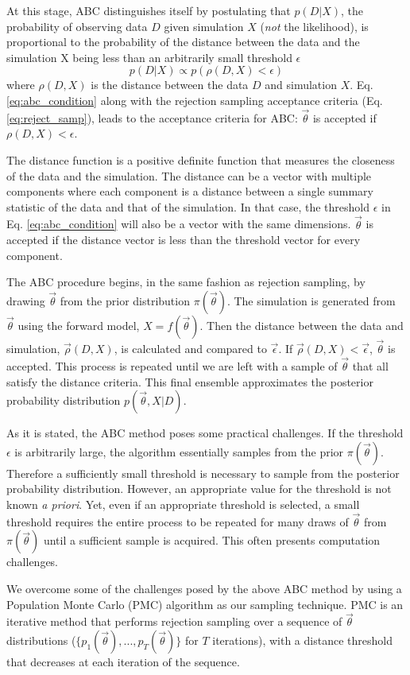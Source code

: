 \documentclass[fleqn,usenatbib]{mnras}
\newcommand{\beq}{\begin{equation}}
\newcommand{\eeq}{\end{equation}}
\newcommand{\pars}{\vec{\theta}}
\begin{document}
At this stage, ABC distinguishes itself by postulating that $p(D|X)$, 
the probability of observing data $D$ given simulation $X$ 
({\em not} the likelihood), is proportional to the 
probability of the distance between the data and the simulation X being less than 
an arbitrarily small threshold $\epsilon$ 
\beq
p(D|X) \propto p(\rho(D,X)<\epsilon)
\label{eq:abc_condition}
\eeq
where $\rho(D, X)$ is the distance between the data $D$ and simulation $X$. 
Eq. \ref{eq:abc_condition} along with the rejection sampling acceptance criteria 
(Eq. \ref{eq:reject_samp}), leads to the acceptance criteria for ABC: $\pars$ is accepted if $\rho(D, X) < \epsilon$. 

The distance function is a positive definite function that measures the closeness 
of the data and the simulation. The distance can be a vector with multiple components 
where each component is a distance between a single summary statistic of the data 
and that of the simulation. In that case, the threshold $\epsilon$ in 
Eq. \ref{eq:abc_condition} will also be a vector with the same dimensions.  
$\pars$ is accepted if the distance vector is less than the threshold vector for 
every component.

The ABC procedure begins, in the same fashion as rejection sampling, by drawing 
$\pars$ from the prior distribution $\pi(\pars)$. The simulation is generated from 
$\pars$ using the forward model, $X = f(\pars)$. Then the distance between 
the data and simulation, $\vec\rho(D, X)$, is calculated and compared to 
$\vec\epsilon$. If $\vec\rho(D, X) < \vec\epsilon$, $\pars$ is accepted. 
This process is repeated until we are left with a sample of $\pars$ that all 
satisfy the distance criteria. This final ensemble approximates the posterior 
probability distribution $p(\pars, X|D)$. 

As it is stated, the ABC method poses some practical challenges. If the 
threshold $\epsilon$ is arbitrarily large, the algorithm essentially 
samples from the prior $\pi(\pars)$. Therefore a sufficiently small threshold
is necessary to sample from the posterior probability distribution. However,
an appropriate value for the threshold is not known \emph{a priori}. Yet, 
even if an appropriate threshold is selected, a small threshold requires 
the entire process to be repeated for many draws of $\pars$ from $\pi(\pars)$ 
until a sufficient sample is acquired. This often presents computation challenges. 

We overcome some of the challenges posed by the above ABC method
by using a Population Monte Carlo (PMC) algorithm as our sampling technique. 
PMC is an iterative method that performs rejection sampling over a 
sequence of $\pars$ distributions ($\{p_1(\pars), ..., p_T(\pars)\}$ for 
$T$ iterations), with a distance threshold that decreases at each iteration of 
the sequence. 
\end{document}
